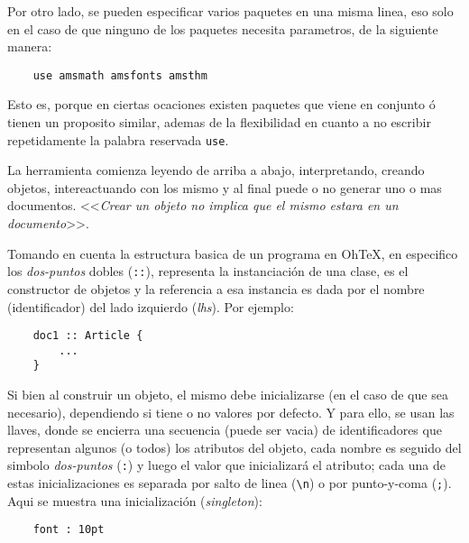 \documentclass[12pt,letterpaper,titlepage,oneside,openright]{book}
\newcommand{\ohtex}{OhTeX}
\begin{document}
Por otro lado, se pueden especificar varios paquetes en una misma linea, eso
solo en el caso de que ninguno de los paquetes necesita parametros, de la
siguiente manera:

\begin{center}
\begin{lstlisting}
    use amsmath amsfonts amsthm
\end{lstlisting}
\end{center}

Esto es, porque en ciertas ocaciones existen paquetes que viene en conjunto ó
tienen un proposito similar, ademas de la flexibilidad en cuanto a no escribir
repetidamente la palabra reservada \texttt{use}.

La herramienta comienza leyendo de arriba a abajo, interpretando, creando
objetos, intereactuando con los mismo y al final puede o no generar uno o mas
documentos. <<\textit{Crear un objeto no implica que el mismo estara en un
documento}>>.

Tomando en cuenta la estructura basica de un programa en \ohtex, en especifico
los \textit{dos-puntos} dobles (\texttt{::}), representa la instanciación de
una clase, es el constructor de objetos y la referencia a esa instancia es dada
por el nombre (identificador) del lado izquierdo (\textit{lhs}). Por ejemplo:

\begin{center}
\begin{lstlisting}
    doc1 :: Article {
        ...
    }   
\end{lstlisting}
\end{center}

Si bien al construir un objeto, el mismo debe inicializarse (en el caso de que
sea necesario), dependiendo si tiene o no valores por defecto. Y para ello, se
usan las llaves, donde se encierra una secuencia (puede ser vacia) de
identificadores que representan algunos (o todos) los atributos del objeto, cada
nombre es seguido del simbolo \textit{dos-puntos} (\texttt{:}) y luego el valor
que inicializará el atributo; cada una de estas inicializaciones es separada por
salto de linea (\verb|\n|) o por punto-y-coma (\texttt{;}). Aqui se muestra una
inicialización (\textit{singleton}):

\begin{center}
\begin{lstlisting}
    font : 10pt
\end{lstlisting}
\end{center}
\end{document}
